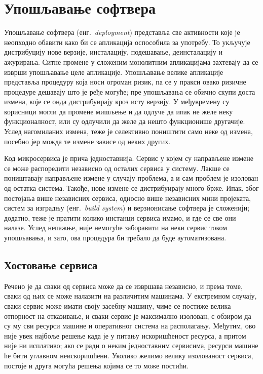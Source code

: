 \documentclass[12pt,oneside]{memoir}
\begin{document}
\section{Упошљавање софтвера}
Упошљавање софтвера (енг.~\textit{deployment}) представља све активности које је неопходно обавити како би се апликација оспособила за употребу. То укључује дистрибуцију нове верзије, инсталацију, подешавање, деинсталацију и ажурирања. Ситне промене у сложеним монолитним апликацијама захтевају да се изврши упошљавање целе апликације. Упошљавање велике апликације представља процедуру која носи огроман ризик, па се у пракси овако ризичне процедуре дешавају што је ређе могуће; пре упошљавања се обично скупи доста измена, које се онда дистрибуирају кроз исту верзију. У међувремену су корисници могли да промене мишљење и да одлуче да ипак не желе неку функционалност, или су одлучили да желе да нешто функционише другачије. Услед нагомиланих измена, теже је селективно поништити само неке од измена, посебно јер можда те измене зависе од неких других.

Код микросервиса је прича једноставнија. Сервис у којем су направљене измене се може распоредити независно од осталих сервиса у систему. Лакше се поништавају направљене измене у случају проблема, а и сам проблем је изолован од остатка система. Такође, нове измене се дистрибуирају много брже. Ипак, због постојања више независних сервиса, односно више независних мини пројеката, систем за изградњу (енг.~\textit{build system}) и верзионисање софтвера је сложенији; додатно, теже је пратити колико инстанци сервиса имамо, и где се све они налазе. Услед непажње, није немогуће заборавити на неки сервис током упошљавања, и зато, ова процедура би требало да буде аутоматизована.

\subsection{Хостовање сервиса}\label{hostovanjeservisa}
Речено је да сваки од сервиса може да се извршава независно, и према томе, сваки од њих се може налазити на различитим машинама. У екстремном случају, сваки сервис може имати своју засебну машину, чиме се постиже велика отпорност на отказивање, и сваки сервис је максимално изолован, с обзиром да су му сви ресурси машине и оперативног система на располагању. Међутим, ово није увек најбоље решење када је у питању искоришћеност ресурса, а притом није ни исплативо; ако се ради о неким једноставним сервисима, ресурси машине ће бити углавном неискоришћени. Уколико желимо велику изолованост сервиса, постоје и друга могућа решења којима се то може постићи.
\end{document}

